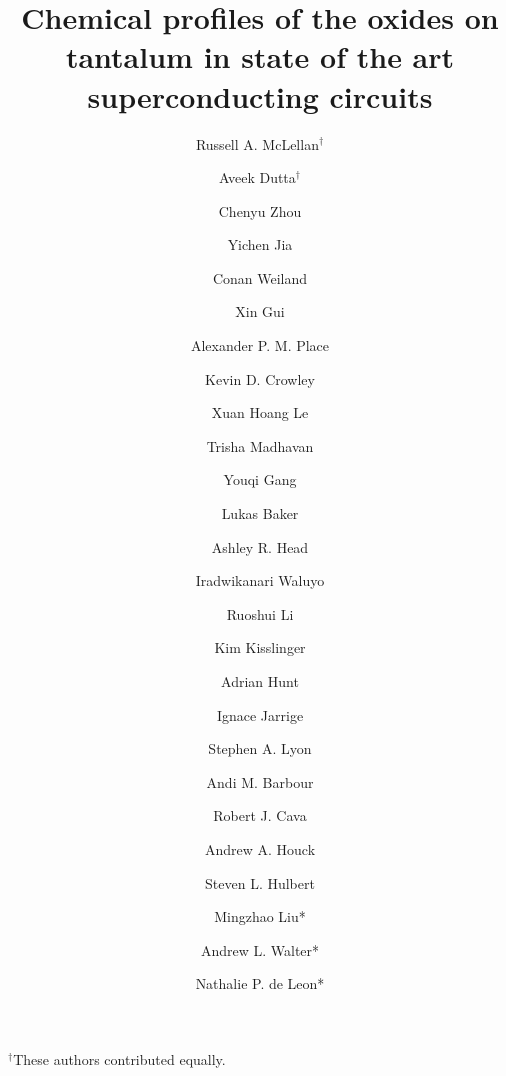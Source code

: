 \documentclass{WileyMSP-template}
\begin{document}
\pagestyle{fancy}



\title{Chemical profiles of the oxides on tantalum in state of the art superconducting circuits}

\maketitle


\author{Russell A. McLellan$^\dag{}$}
\author{Aveek Dutta$^\dag{}$}
\author{Chenyu Zhou}
\author{Yichen Jia}
\author{Conan Weiland}
\author{Xin Gui}
\author{Alexander P. M. Place}
\author{Kevin D. Crowley}
\author{Xuan Hoang Le}
\author{Trisha Madhavan}
\author{Youqi Gang}
\author{Lukas Baker}
\author{Ashley R. Head}
\author{Iradwikanari Waluyo}
\author{Ruoshui Li}
\author{Kim Kisslinger}
\author{Adrian Hunt}
\author{Ignace Jarrige}
\author{Stephen A. Lyon}
\author{Andi M. Barbour}
\author{Robert J. Cava}
\author{Andrew A. Houck}
\author{Steven L. Hulbert}
\author{Mingzhao Liu*}
\author{Andrew L. Walter*}
\author{Nathalie P. de Leon*}

$^\dag{}$These authors contributed equally.




\dedication{}
\end{document}
